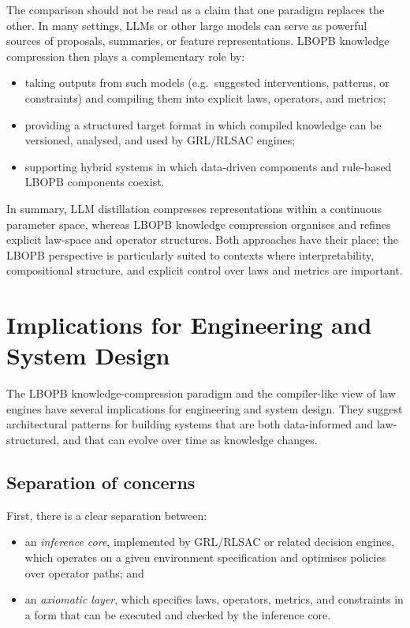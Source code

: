 \documentclass[11pt]{book}
\theoremstyle{plain}
\theoremstyle{definition}
\theoremstyle{remark}
\begin{document}
The comparison should not be read as a claim that one paradigm replaces
the other. In many settings, LLMs or other large models can serve as
powerful sources of proposals, summaries, or feature representations.
LBOPB knowledge compression then plays a complementary role by:

\begin{itemize}
  \item taking outputs from such models (e.g.\ suggested interventions,
        patterns, or constraints) and compiling them into explicit
        laws, operators, and metrics;
  \item providing a structured target format in which compiled
        knowledge can be versioned, analysed, and used by GRL/RLSAC
        engines;
  \item supporting hybrid systems in which data-driven components and
        rule-based LBOPB components coexist.
\end{itemize}

In summary, LLM distillation compresses representations within a
continuous parameter space, whereas LBOPB knowledge compression
organises and refines explicit law-space and operator structures.
Both approaches have their place; the LBOPB perspective is
particularly suited to contexts where interpretability, compositional
structure, and explicit control over laws and metrics are important.

\section{Implications for Engineering and System Design}


The LBOPB knowledge-compression paradigm and the compiler-like view
of law engines have several implications for engineering and system
design. They suggest architectural patterns for building systems that
are both data-informed and law-structured, and that can evolve over
time as knowledge changes.

\subsection*{Separation of concerns}

First, there is a clear separation between:

\begin{itemize}
  \item an \emph{inference core}, implemented by GRL/RLSAC or related
        decision engines, which operates on a given environment
        specification and optimises policies over operator paths; and
  \item an \emph{axiomatic layer}, which specifies laws, operators,
        metrics, and constraints in a form that can be executed and
        checked by the inference core.
\end{itemize}
\end{document}
